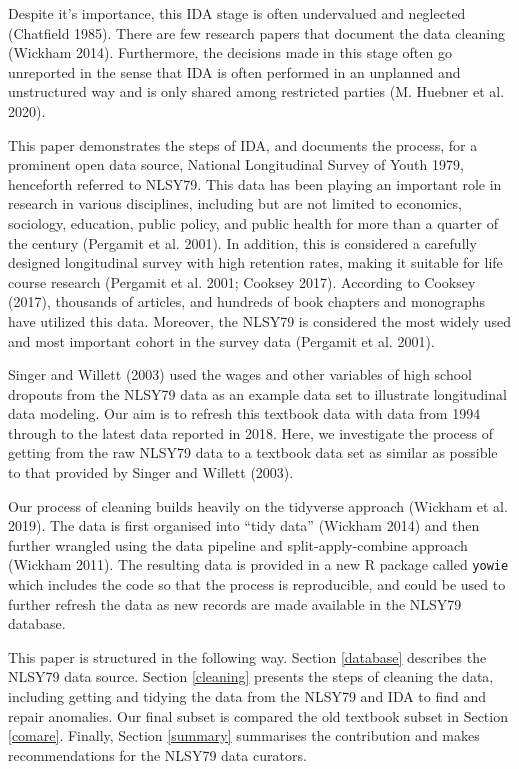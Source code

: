 \documentclass{article}
\begin{document}
Despite it's importance, this IDA stage is often undervalued and neglected (Chatfield 1985). There are few research papers that document the data cleaning (Wickham 2014). Furthermore, the decisions made in this stage often go unreported in the sense that IDA is often performed in an unplanned and unstructured way and is only shared among restricted parties (M. Huebner et al. 2020).

This paper demonstrates the steps of IDA, and documents the process, for a prominent open data source, National Longitudinal Survey of Youth 1979, henceforth referred to NLSY79. This data has been playing an important role in research in various disciplines, including but are not limited to economics, sociology, education, public policy, and public health for more than a quarter of the century (Pergamit et al. 2001). In addition, this is considered a carefully designed longitudinal survey with high retention rates, making it suitable for life course research (Pergamit et al. 2001; Cooksey 2017). According to Cooksey (2017), thousands of articles, and hundreds of book chapters and monographs have utilized this data. Moreover, the NLSY79 is considered the most widely used and most important cohort in the survey data (Pergamit et al. 2001).

Singer and Willett (2003) used the wages and other variables of high school dropouts from the NLSY79 data as an example data set to illustrate longitudinal data modeling. Our aim is to refresh this textbook data with data from 1994 through to the latest data reported in 2018. Here, we investigate the process of getting from the raw NLSY79 data to a textbook data set as similar as possible to that provided by Singer and Willett (2003).

Our process of cleaning builds heavily on the tidyverse approach (Wickham et al. 2019). The data is first organised into ``tidy data'' (Wickham 2014) and then further wrangled using the data pipeline and split-apply-combine approach (Wickham 2011). The resulting data is provided in a new R package called \texttt{yowie} which includes the code so that the process is reproducible, and could be used to further refresh the data as new records are made available in the NLSY79 database.

This paper is structured in the following way. Section \ref{database} describes the NLSY79 data source. Section \ref{cleaning} presents the steps of cleaning the data, including getting and tidying the data from the NLSY79 and IDA to find and repair anomalies. Our final subset is compared the old textbook subset in Section \ref{comare}. Finally, Section \ref{summary} summarises the contribution and makes recommendations for the NLSY79 data curators.
\end{document}
